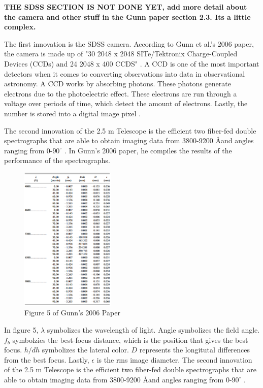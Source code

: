 \documentclass[preprint,linenumbers, longauthor]{aastex631}
\begin{document}
\textbf{THE SDSS SECTION IS NOT DONE YET, add more detail about the camera and other stuff in the Gunn paper section 2.3. Its a little complex.}

The first innovation is the SDSS camera. According to Gunn et al.'s 2006 paper, the camera is made up of "30 2048 x 2048 SITe/Tektronix Charge-Coupled Devices (CCDs) and 24 2048 x 400 CCDS" \cite{gunn25TelescopeSloan2006}. 
A CCD is one of the most important detectors when it comes to converting observations into data in observational astronomy.
A CCD works by absorbing photons. These photons generate electrons due to the photoelectric effect. These electrons are run through a voltage over periods of time, which detect the amount of electrons. Lastly, the number is stored into a digital image pixel \cite{lesserSummaryChargeCoupledDevices2015}.


The second innovation of the 2.5 m Telescope is the efficient two fiber-fed double spectrographs that are able to obtain imaging data from 3800-9200 \AA \space and angles ranging from 0-$90^\circ$ \cite{gunn25TelescopeSloan2006}. 
In Gunn's 2006 paper, he compiles the results of the performance of the spectrographs.
\begin{figure}[h!]
  \centering
  \includegraphics[width=0.4\textwidth]{gunn_table_5.png}
  \caption{Figure 5 of Gunn's 2006 Paper}
  \label{fig:SDSS_Table}
\end{figure}

In figure 5, $\lambda$ symbolizes the wavelength of light. Angle symbolizes the field angle. $f_b$ symbolzies the best-focus distance, which is the position that gives the best focus.
$h/dh$ symbolizes the lateral color. $D$ represents the longitutal differences from the best focus. Lastly, $\epsilon$ is the rms image diameter.
The second innovation of the 2.5 m Telescope is the efficient two fiber-fed double spectrographs that are able to obtain imaging data from 3800-9200 \AA \space and angles ranging from 0-$90^\circ$ \cite{gunn25TelescopeSloan2006}. 
\end{document}
